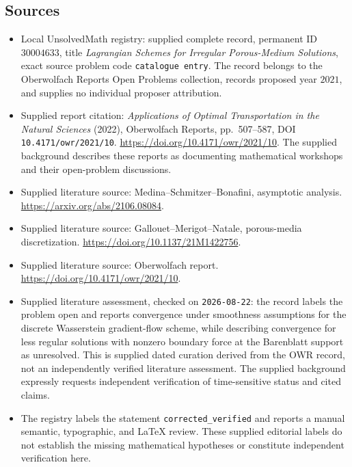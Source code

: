 \documentclass[11pt]{article}
\begin{document}
\subsection{Sources}
\begin{itemize}
\item Local UnsolvedMath registry: supplied complete record, permanent ID \(30004633\), title \emph{Lagrangian Schemes for Irregular Porous-Medium Solutions}, exact source problem code \texttt{catalogue entry}. The record belongs to the Oberwolfach Reports Open Problems collection, records proposed year \(2021\), and supplies no individual proposer attribution.
\item Supplied report citation: \emph{Applications of Optimal Transportation in the Natural Sciences} (2022), Oberwolfach Reports, pp.~507--587, DOI \texttt{10.4171/owr/2021/10}. \url{https://doi.org/10.4171/owr/2021/10}. The supplied background describes these reports as documenting mathematical workshops and their open-problem discussions.
\item Supplied literature source: Medina--Schmitzer--Bonafini, asymptotic analysis. \url{https://arxiv.org/abs/2106.08084}.
\item Supplied literature source: Gallouet--Merigot--Natale, porous-media discretization. \url{https://doi.org/10.1137/21M1422756}.
\item Supplied literature source: Oberwolfach report. \url{https://doi.org/10.4171/owr/2021/10}.
\item Supplied literature assessment, checked on \texttt{2026-08-22}: the record labels the problem open and reports convergence under smoothness assumptions for the discrete Wasserstein gradient-flow scheme, while describing convergence for less regular solutions with nonzero boundary force at the Barenblatt support as unresolved. This is supplied dated curation derived from the OWR record, not an independently verified literature assessment. The supplied background expressly requests independent verification of time-sensitive status and cited claims.
\item The registry labels the statement \texttt{corrected\_verified} and reports a manual semantic, typographic, and LaTeX review. These supplied editorial labels do not establish the missing mathematical hypotheses or constitute independent verification here.
\end{itemize}
\end{document}
